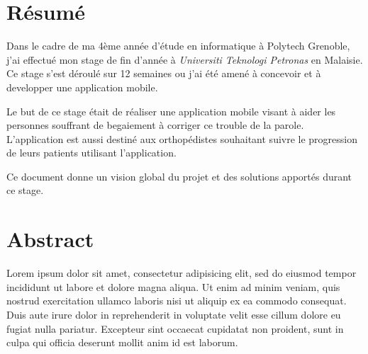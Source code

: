 \chapter*{Résumé}
Dans le cadre de ma 4ème année d'étude en informatique à Polytech Grenoble, j'ai effectué mon stage de fin d'année à \textit{Universiti Teknologi Petronas} en Malaisie. Ce stage s'est déroulé sur 12 semaines ou j'ai été amené à concevoir et à developper une application mobile.

Le but de ce stage était de réaliser une application mobile visant à aider les personnes souffrant de begaiement à corriger ce trouble de la parole. L'application est aussi destiné aux orthopédistes souhaitant suivre le progression de leurs patients utilisant l'application.

Ce document donne un vision global du projet et des solutions apportés durant ce stage.

\vspace{4cm}

\begingroup
\let\clearpage\relax
\chapter*{Abstract}
\endgroup

Lorem ipsum dolor sit amet, consectetur adipisicing elit, sed do eiusmod tempor incididunt ut labore et dolore magna aliqua. Ut enim ad minim veniam, quis nostrud exercitation ullamco laboris nisi ut aliquip ex ea commodo consequat. Duis aute irure dolor in reprehenderit in voluptate velit esse cillum dolore eu fugiat nulla pariatur. Excepteur sint occaecat cupidatat non proident, sunt in culpa qui officia deserunt mollit anim id est laborum.
